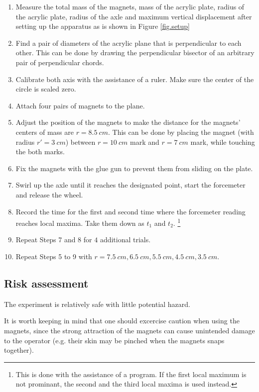 \documentclass[a4paper]{article}
\begin{document}
\begin{enumerate}
    \item Measure the total mass of the magnets, mass of the acrylic plate, radius of the acrylic plate, radius of the axle and maximum vertical displacement after setting up the apparatus as is shown in Figure \ref{fig.setup}
    \item Find a pair of diameters of the acrylic plane that is perpendicular to each other. This can be done by drawing the perpendicular bisector of an arbitrary pair of perpendicular chords. 
    \item Calibrate both axis with the assistance of a ruler. Make sure the center of the circle is scaled zero. 
    \item Attach four pairs of magnets to the plane.
    \item Adjust the position of the magnets to make the distance for the magnets' centers of mass are $r = \SI{8.5}{cm}$. This can be done by placing the magnet (with radius $r' = \SI{3}{cm}$) between $r = \SI{10}{cm}$ mark and $r = \SI{7}{cm}$ mark, while touching the both marks.
    \item Fix the magnets with the glue gun to prevent them from sliding on the plate.
    \item Swirl up the axle until it reaches the designated point, start the forcemeter and release the wheel. 
    \item Record the time for the first and second time where the forcemeter reading reaches local maxima. Take them down as $t_1$ and $t_2$. \footnote{This is done with the assistance of a program. If the first local maximum is not prominant, the second and the third local maxima is used instead.} 
    \item Repeat Steps 7 and 8 for $4$ additional trials.
    \item Repeat Steps 5 to 9 with $r = \SI{7.5}{cm}, \SI{6.5}{cm}, \SI{5.5}{cm}, \SI{4.5}{cm}, \SI{3.5}{cm}$.
\end{enumerate}

\subsection{Risk assessment}

The experiment is relatively safe with little potential hazard. 

It is worth keeping in mind that one should excercise caution when using the magnets, since the strong attraction of the magnets can cause unintended damage to the operator (e.g. their skin may be pinched when the magnets snaps together).
\end{document}
